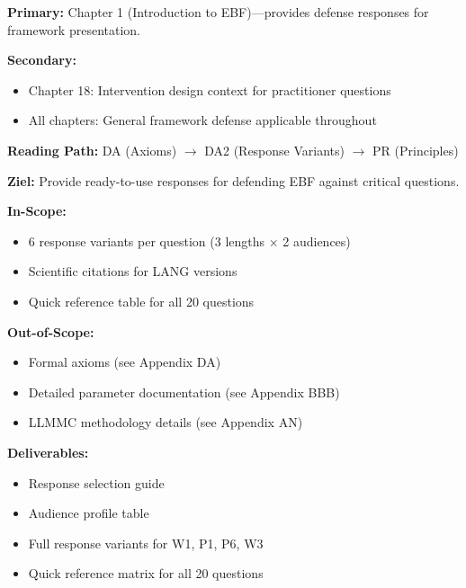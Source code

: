 
\begin{tcolorbox}[colback=blue!5!white, colframe=blue!75!black,
    title=Chapter Linkage]
\textbf{Primary:} Chapter 1 (Introduction to EBF)---provides defense responses for framework presentation.

\textbf{Secondary:}
\begin{itemize}[nosep]
    \item Chapter 18: Intervention design context for practitioner questions
    \item All chapters: General framework defense applicable throughout
\end{itemize}

\textbf{Reading Path:} DA (Axioms) $\rightarrow$ DA2 (Response Variants) $\rightarrow$ PR (Principles)
\end{tcolorbox}


\begin{tcolorbox}[colback=green!5!white, colframe=green!75!black,
    title=Appendix Scope: Response Variants]
\textbf{Ziel:} Provide ready-to-use responses for defending EBF against critical questions.

\textbf{In-Scope:}
\begin{itemize}[nosep]
    \item 6 response variants per question (3 lengths $\times$ 2 audiences)
    \item Scientific citations for LANG versions
    \item Quick reference table for all 20 questions
\end{itemize}

\textbf{Out-of-Scope:}
\begin{itemize}[nosep]
    \item Formal axioms (see Appendix DA)
    \item Detailed parameter documentation (see Appendix BBB)
    \item LLMMC methodology details (see Appendix AN)
\end{itemize}

\textbf{Deliverables:}
\begin{itemize}[nosep]
    \item Response selection guide
    \item Audience profile table
    \item Full response variants for W1, P1, P6, W3
    \item Quick reference matrix for all 20 questions
\end{itemize}
\end{tcolorbox}

